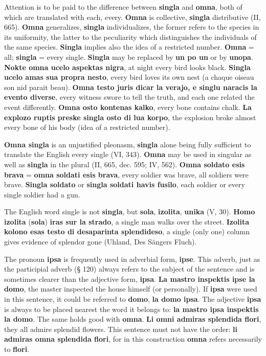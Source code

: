 Attention is to be paid to the difference between \textbf{singla} and \textbf{omna}, both of which are translated with each, every. \textbf{Omna} is collective, \textbf{singla} distributive (II, 665). \textbf{Omna} generalizes, \textbf{singla} individualizes, the former refers to the species in its uniformity, the latter to the peculiarity which distinguishes the individuals of the same species. \textbf{Singla} implies also the idea of a restricted number. \textbf{Omna} = all; \textbf{singla} = every single. \textbf{Singla} may be replaced by \textbf{un po un} or by \textbf{unopa}. \textbf{Nokte omna ucelo aspektas nigra}, at night every bird looks black. \textbf{Singla ucelo amas sua propra nesto}, every bird loves its own nest (a chaque oiseau son nid parait beau). \textbf{Omna testo juris dicar la verajo, e singlu naracis la evento diverse}, every witness swore to tell the truth, and each one related the event differently. \textbf{Omna osto kontenas kalko}, every bone contains chalk. \textbf{La explozo ruptis preske singla osto di lua korpo}, the explosion broke almost every bone of his body (idea of a restricted number). 

\textbf{Omna singla} is an unjustified pleonasm, \textbf{singla} alone being fully sufficient to translate the English every single (VI, 343). \textbf{Omna} may be used in singular as well as \textbf{singla} in the plural (II, 665, dec. 595; IV, 562). \textbf{Omna soldato esis brava} = \textbf{omna soldati esis brava}, every soldier was brave, all soldiers were brave. \textbf{Singla soldato} or \textbf{singla soldati havis fusilo}, each soldier or every single soldier had a gun. 

The English word single is not \textbf{singla}, but \textbf{sola}, \textbf{izolita}, \textbf{unika} (V, 30). \textbf{Homo izolita }(\textbf{sola})\textbf{ iras sur la strado}, a single man walks over the street. \textbf{Izolita kolono esas testo di desaparinta splendideso}, a single (only one) column gives evidence of splendor gone (Uhland, Des Sängers Fluch). 

The pronoun \textbf{ipsa} is frequently used in adverbial form, \textbf{ipse}. This adverb, just as the participial adverb (§ 120) always refers to the subject of the sentence and is sometimes clearer than the adjective form, \textbf{ipsa}. \textbf{La mastro inspektis ipse la domo}, the master inspected the house himself (or personally). If \textbf{ipsa} were used in this sentence, it could be referred to \textbf{domo}, \textbf{la domo ipsa}. The adjective \textbf{ipsa} is always to be placed nearest the word it belongs to: \textbf{la mastro ipsa inspektis la domo}. The same holds good with \textbf{omna}. \textbf{Li omni admiras splendida flori}, they all admire splendid flowers. This sentence must not have the order: \textbf{li admiras omna splendida flori}, for in this construction \textbf{omna} refers necessarily to \textbf{flori}.


